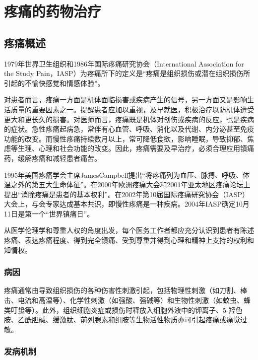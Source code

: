 \chapter{疼痛的药物治疗}

\section{疼痛概述}

1979年世界卫生组织和1986年国际疼痛研究协会（International Association
for the Study
Pain，IASP）为疼痛所下的定义是“疼痛是组织损伤或潜在组织损伤所引起的不愉快感觉和情感体验”。

对患者而言，疼痛一方面是机体面临损害或疾病产生的信号，另一方面又是影响生活质量的重要因素之一。提醒患者应加以重视，及早就医，积极治疗以防机体遭受更大和更长久的损害。对医师而言，疼痛既是机体对创伤或疾病的反应，也是疾病的症状。急性疼痛起病急，常伴有心血管、呼吸、消化以及代谢、内分泌甚至免疫功能的改变。而慢性疼痛持续数月以上，常可降低食欲，影响睡眠，导致抑郁、焦虑等生理、心理和社会功能的改变。因此，疼痛需要及早治疗，必须合理应用镇痛药，缓解疼痛和减轻患者痛苦。

1995年美国疼痛学会主席JamesCampbell提出“将疼痛列为血压、脉搏、呼吸、体温之外的第五大生命体征”。在2000年欧洲疼痛大会和2001年亚太地区疼痛论坛上提出“消除疼痛是患者的基本权利”。在2002年第10届国际疼痛研究协会（IASP）大会上，与会专家达成基本共识，即慢性疼痛是一种疾病。2004年IASP确定10月11日是第一个“世界镇痛日”。

从医学伦理学和尊重人权的角度出发，每个医务工作者都应充分认识到患者有陈述疼痛、表达疼痛程度、得到完全镇痛、受到尊重并得到心理和精神上支持的权利和知情权。

\subsection{病因}

疼痛通常由导致组织损伤的各种伤害性刺激引起，包括物理性刺激（如刀割、棒击、电流和高温等）、化学性刺激（如强酸、强碱等）和生物性刺激（如蚊虫、蜂类叮蛰等）。此外，组织细胞炎症或损伤时释放入细胞外液中的钾离子、5-羟色胺、乙酰胆碱、缓激肽、前列腺素和组胺等生物活性物质亦可引起疼痛或痛觉过敏。

\subsection{发病机制}

